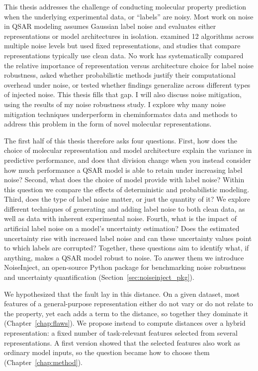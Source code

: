 This thesis addresses the challenge of conducting molecular property prediction when the underlying experimental data, or ``labels'' are noisy. Most work on noise in QSAR modeling assumes Gaussian label noise and evaluates either representations or model architectures in isolation. \citet{Cortes2015} examined 12 algorithms across multiple noise levels but used fixed representations, and studies that compare representations typically use clean data. No work has systematically compared the relative importance of representation versus architecture choice for label noise robustness, asked whether probabilistic methods justify their computational overhead under noise, or tested whether findings generalize across different types of injected noise. This thesis fills that gap. I will also discuss noise mitigation, using the results of my noise robustness study. I explore why many noise mitigation techniques underperform in cheminformatcs data and methods to address this problem in the form of novel molecular representations.

The first half of this thesis therefore asks four questions.\label{sec:intro:questions} First, how does the choice of molecular representation and model architecture explain the variance in predictive performance, and does that division change when you instead consider how much performance a QSAR model is able to retain under increasing label noise? Second, what does the choice of model provide with label noise? Within this question we compare the effects of deterministic and probabilistic modeling. Third, does the type of label noise matter, or just the quantity of it? We explore different techniques of generating and adding label noise to both clean data, as well as data with inherent experimental noise. Fourth, what is the impact of artificial label noise on a model's uncertainty estimation? Does the estimated uncertainty rise with increased label noise and can these uncertainty values point to which labels are corrupted? Together, these questions aim to identify what, if anything, makes a QSAR model robust to noise. To answer them we introduce NoiseInject, an open-source Python package for benchmarking noise robustness and uncertainty quantification (Section~\ref{sec:noiseinject_pkg}).


We hypothesized that the fault lay in this distance. On a given dataset, most features of a general-purpose representation either do not vary or do not relate to the property, yet each adds a term to the distance, so together they dominate it (Chapter~\ref{chap:flaws}). We propose instead to compute distances over a hybrid representation: a fixed number of task-relevant features selected from several representations. A first version showed that the selected features also work as ordinary model inputs, so the question became how to choose them (Chapter~\ref{chap:method}).

